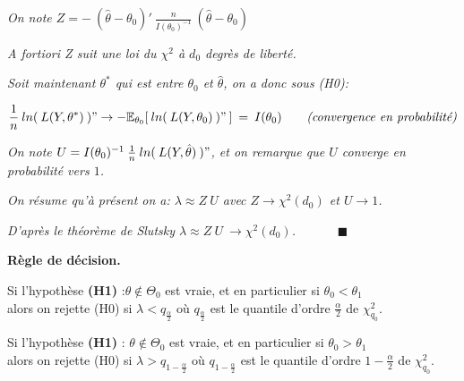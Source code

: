\documentclass[12pt,fleqn]{book} %
\begin{document}
\textit{On note $Z=-\:(\hat{\theta}-\theta_0)'\:\frac{n}{I(\theta_0)^{-1}}\:(\hat{\theta}-\theta_0)$}

\vspace{1em}

\textit{A fortiori Z suit une loi du $\chi^2$ à $d_0$ degrès de liberté.} 

\vspace{2em}

\textit{Soit maintenant $\theta^{*}$ qui est entre $\theta_0$ et $\hat{\theta}$, on a donc sous (H0):}

\[
\frac{1}{n}\:ln(\:L(Y,\theta^{*})\:)" \rightarrow -\mathbb{E}_{\theta_0}[\:ln(\:L(Y,\theta_0)\:)"\:]\:=\:I(\theta_0) \qquad \textit{(convergence en probabilité)}
\]

\vspace{0.5em}

\textit{On note $U=I(\theta_0)^{-1}\:\frac{1}{n}\:ln(\:L(Y,\hat{\theta})\:)"$, et on remarque que $U$ converge en probabilité vers $1$.}

\vspace{1em}

\textit{On résume qu'à présent on a: $\lambda\approx Z\:U$ avec\: $Z\rightarrow\chi^2(d_0)$ \:et\: $U\rightarrow 1$.}

\vspace{1em}

\textit{D'après le théorème de Slutsky  \:$\lambda\approx Z\:U \:\rightarrow \chi^2(d_0)$.} $\quad\quad\quad \blacksquare$ 

\vspace{2em}

\textbf{Règle de décision.}

\vspace{1em}

Si l'hypothèse \textbf{(H1)} :\:$ \theta \notin \Theta_0 $ est vraie, et en particulier si $\theta_0 < \theta_1$\\
alors on rejette (H0) si \: $\lambda < q_{\frac{\alpha}{2}}$ \:où\: $q_{\frac{\alpha}{2}}$ est le quantile d'ordre $\frac{\alpha}{2}$ de $\chi_{q_0}^2$.

\vspace{1em}

Si l'hypothèse \textbf{(H1)} :\: $ \theta \notin \Theta_0 $ est vraie, et en particulier si $\theta_0 > \theta_1$\\
alors on rejette (H0) si \: $\lambda > q_{1-\frac{\alpha}{2}}$ \:où\: $q_{1-\frac{\alpha}{2}}$ est le quantile d'ordre $1-\frac{\alpha}{2}$ de $\chi_{q_0}^2$.
\end{document}
